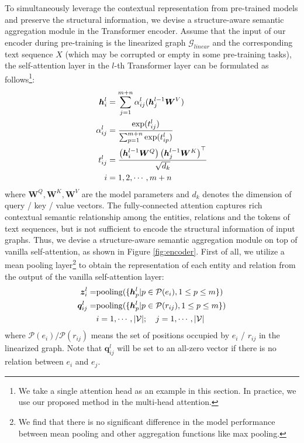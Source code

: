 \documentclass[11pt,a4paper]{article}
\begin{document}
To simultaneously leverage the contextual representation from pre-trained models and preserve the structural information, we devise a structure-aware semantic aggregation module in the Transformer encoder. 
Assume that the input of our encoder during pre-training is the linearized graph $\mathcal{G}_{linear}$ and the corresponding text sequence $X$ (which may be corrupted or empty in some pre-training tasks), the self-attention layer in the $l$-th Transformer layer can be formulated as follows\footnote{We take a single attention head as an example in this section. In practice, we use our proposed method in the multi-head attention.}:
\begin{align}
    \bm{h}_i^l & = \sum_{j=1}^{m+n} \alpha_{ij}^l (\bm{h}_j^{l-1}\bm{W}^V) \notag \\
    \alpha_{ij}^{l} & = \frac{\exp(t_{ij}^{l})}{\sum_{p=1}^{m+n} \exp(t_{ip}^{l})} \\
    t_{ij}^{l} & = \frac{\left(\bm{h}_i^{l-1}\bm{W}^Q\right)\left(\bm{h}_j^{l-1}\bm{W}^K\right)^\top}{\sqrt{d_k}} \notag\\
    i & = 1,2,\cdots,m+n \notag
\end{align}
where $\bm{W}^Q,\bm{W}^K,\bm{W}^V$ are the model parameters
and $d_k$ denotes the dimension of query / key / value vectors. The fully-connected attention captures rich contextual semantic relationship among the entities, relations and the tokens of text sequences, but is not sufficient to encode the structural information of input graphs. Thus, we devise a structure-aware semantic aggregation module on top of vanilla self-attention, as shown in Figure \ref{fig:encoder}. First of all, we utilize a mean pooling layer\footnote{We find that there is no significant difference in the model performance between mean pooling and other aggregation functions like max pooling.} to obtain the representation of each entity and relation from the output of the vanilla self-attention layer:
\begin{align}
    \bm{z}_{i}^{l} = & \mathrm{pooling}(\{\bm{h}_p^l|p\in \mathcal{P}(e_i),1\leq p\leq m\}) \notag \\
    \bm{q}_{ij}^{l} = & \mathrm{pooling}(\{\bm{h}_p^l|p\in \mathcal{P}(r_{ij}),1\leq p\leq m\}) \notag \\
    & i=1,\cdots,|\mathcal{V}|;\quad j=1,\cdots,|\mathcal{V}|
\end{align}
where $\mathcal{P}(e_i) / \mathcal{P}(r_{ij})$ means the set of positions occupied by $e_i$ / $r_{ij}$ in the linearized graph.
Note that $\bm{q}_{ij}^{l}$ will be set to an all-zero vector if there is no relation between $e_i$ and $e_j$. 
\end{document}
